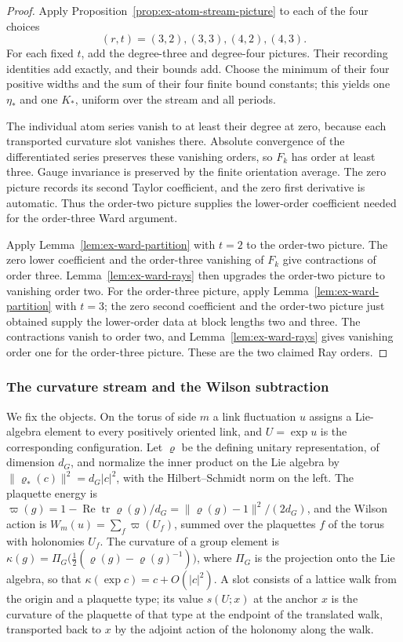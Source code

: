 \begin{proof}
Apply Proposition~\ref{prop:ex-atom-stream-picture} to each of the four
choices
\[
       (r,t)=(3,2),(3,3),(4,2),(4,3).
\]
For each fixed $t$, add the degree-three and degree-four pictures. Their
recording identities add exactly, and their bounds add. Choose the minimum
of their four positive widths and the sum of their four finite bound
constants; this yields one $\eta_*$ and one $K_*$, uniform over the stream
and all periods.

The individual atom series vanish to at least their degree at zero, because
each transported curvature slot vanishes there. Absolute convergence of
the differentiated series preserves these vanishing orders, so $F_k$ has
order at least three. Gauge invariance is preserved by the finite
orientation average. The zero picture records its second Taylor
coefficient, and the zero first derivative is automatic. Thus the
order-two picture supplies the lower-order coefficient needed for the
order-three Ward argument.

Apply Lemma~\ref{lem:ex-ward-partition} with $t=2$ to the order-two
picture. The zero lower coefficient and the order-three vanishing of
$F_k$ give contractions of order three. Lemma~\ref{lem:ex-ward-rays}
then upgrades the order-two picture to vanishing order two. For the
order-three picture, apply Lemma~\ref{lem:ex-ward-partition} with $t=3$;
the zero second coefficient and the order-two picture just obtained supply
the lower-order data at block lengths two and three. The contractions
vanish to order two, and Lemma~\ref{lem:ex-ward-rays} gives vanishing
order one for the order-three picture. These are the two claimed Ray
orders.
\end{proof}

\subsubsection{The curvature stream and the Wilson subtraction}

We fix the objects. On the torus of side $m$ a link fluctuation $u$
assigns a Lie-algebra element to every positively oriented link, and
$U=\exp u$ is the corresponding configuration. Let $\varrho$ be the
defining unitary representation, of dimension $d_G$, and normalize the
inner product on the Lie algebra by $\|\varrho_*(c)\|^2=d_G|c|^2$, with
the Hilbert--Schmidt norm on the left. The plaquette energy is
$\varpi(g)=1-\operatorname{Re}\operatorname{tr}\varrho(g)/d_G
=\|\varrho(g)-1\|^2/(2d_G)$, and the Wilson action is
$W_m(u)=\sum_f\varpi(U_f)$, summed over the plaquettes $f$ of the torus
with holonomies $U_f$. The curvature of a group element is
$\kappa(g)=\Pi_G\bigl(\tfrac12(\varrho(g)-\varrho(g)^{-1})\bigr)$, where
$\Pi_G$ is the projection onto the Lie algebra, so that
$\kappa(\exp c)=c+O(|c|^2)$. A slot consists of a lattice walk from
the origin and a plaquette type; its value $s(U;x)$ at the anchor $x$
is the curvature of the plaquette of that type at the endpoint of the
translated walk, transported back to $x$ by the adjoint action of the
holonomy along the walk.

